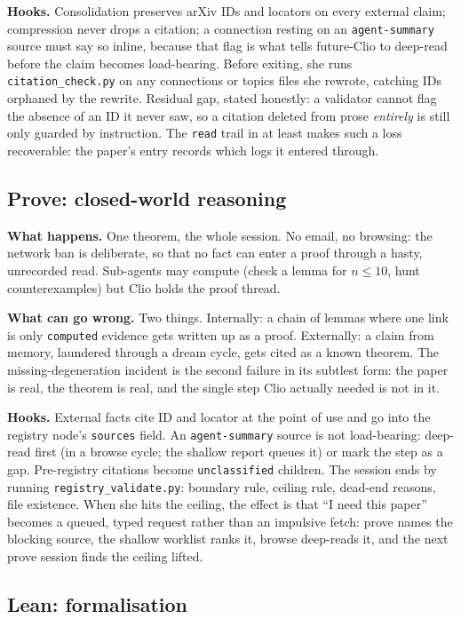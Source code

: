 \documentclass[11pt,a4paper]{article}
\newcommand{\level}[1]{\texttt{#1}}
\begin{document}
\textbf{Hooks.} Consolidation preserves arXiv IDs and locators on every
external claim; compression never drops a citation; a connection resting on
an \level{agent-summary} source must say so inline, because that flag is
what tells future-Clio to deep-read before the claim becomes load-bearing.
Before exiting, she runs \texttt{citation\_check.py} on any connections or
topics files she rewrote, catching IDs orphaned by the rewrite. Residual
gap, stated honestly: a validator cannot flag the absence of an ID it never
saw, so a citation deleted from prose \emph{entirely} is still only guarded
by instruction. The \texttt{read} trail in  at least
makes such a loss recoverable: the paper's entry records which logs it
entered through.

\subsection{Prove: closed-world reasoning}

\textbf{What happens.} One theorem, the whole session. No email, no
browsing: the network ban is deliberate, so that no fact can enter a proof
through a hasty, unrecorded read. Sub-agents may compute (check a lemma for
$n \le 10$, hunt counterexamples) but Clio holds the proof thread.

\textbf{What can go wrong.} Two things. Internally: a chain of lemmas where
one link is only \level{computed} evidence gets written up as a proof.
Externally: a claim from memory, laundered through a dream cycle, gets cited
as a known theorem. The missing-degeneration incident is the second failure
in its subtlest form: the paper is real, the theorem is real, and the single
step Clio actually needed is not in it.

\textbf{Hooks.} External facts cite ID and locator at the point of use and
go into the registry node's \texttt{sources} field. An \level{agent-summary}
source is not load-bearing: deep-read first (in a browse cycle; the shallow
report queues it) or mark the step as a gap. Pre-registry citations become
\level{unclassified} children. The session ends by running
\texttt{registry\_validate.py}: boundary rule, ceiling rule, dead-end
reasons, file existence. When she hits the ceiling, the effect is that ``I
need this paper'' becomes a queued, typed request rather than an impulsive
fetch: prove names the blocking source, the shallow worklist ranks it,
browse deep-reads it, and the next prove session finds the ceiling lifted.

\subsection{Lean: formalisation}
\end{document}
